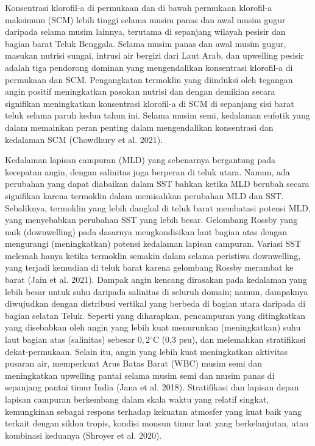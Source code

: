 \begin{spacing}{1.5}
	Konsentrasi klorofil-a di permukaan dan di bawah permukaan klorofil-a maksimum (SCM) lebih tinggi selama musim panas dan awal musim gugur daripada selama musim lainnya, terutama di sepanjang wilayah pesisir dan bagian barat Teluk Benggala. Selama musim panas dan awal musim gugur, masukan nutrisi sungai, intrusi air bergizi dari Laut Arab, dan upwelling pesisir adalah tiga pendorong dominan yang mengendalikan konsentrasi klorofil-a di permukaan dan SCM. Pengangkatan termoklin yang diinduksi oleh tegangan angin positif meningkatkan pasokan nutrisi dan dengan demikian secara signifikan meningkatkan konsentrasi klorofil-a di SCM di sepanjang sisi barat teluk selama paruh kedua tahun ini. Selama musim semi, kedalaman eufotik yang dalam memainkan peran penting dalam mengendalikan konsentrasi dan kedalaman SCM (Chowdhury et al. 2021).
	
	Kedalaman lapisan campuran (MLD) yang sebenarnya bergantung pada kecepatan angin, dengan salinitas juga berperan di teluk utara. Namun, ada perubahan yang dapat diabaikan dalam SST bahkan ketika MLD berubah secara signifikan karena termoklin dalam memisahkan perubahan MLD dan SST. Sebaliknya, termoklin yang lebih dangkal di teluk barat membatasi potensi MLD, yang menyebabkan perubahan SST yang lebih besar. Gelombang Rossby yang naik (downwelling) pada dasarnya mengkondisikan laut bagian atas dengan mengurangi (meningkatkan) potensi kedalaman lapisan campuran. Variasi SST melemah hanya ketika termoklin semakin dalam selama peristiwa downwelling, yang terjadi kemudian di teluk barat karena gelombang Rossby merambat ke barat (Jain et al. 2021). Dampak angin kencang dirasakan pada kedalaman yang lebih besar untuk suhu daripada salinitas di seluruh domain; namun, dampaknya diwujudkan dengan distribusi vertikal yang berbeda di bagian utara daripada di bagian selatan Teluk. Seperti yang diharapkan, pencampuran yang ditingkatkan yang disebabkan oleh angin yang lebih kuat menurunkan (meningkatkan) suhu laut bagian atas (salinitas) sebesar $0,2^\circ$C (0,3 psu), dan melemahkan stratifikasi dekat-permukaan. Selain itu, angin yang lebih kuat meningkatkan aktivitas pusaran air, memperkuat Arus Batas Barat (WBC) musim semi dan meningkatkan upwelling pantai selama musim semi dan musim panas di sepanjang pantai timur India (Jana et al. 2018). Stratifikasi dan lapisan depan lapisan campuran berkembang dalam skala waktu yang relatif singkat, kemungkinan sebagai respons terhadap kekuatan atmosfer yang kuat baik yang terkait dengan siklon tropis, kondisi monsun timur laut yang berkelanjutan, atau kombinasi keduanya (Shroyer et al. 2020). 
	

\end{spacing}
